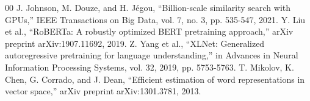 \documentclass[conference]{IEEEtran}
\begin{document}
\begin{thebibliography}{00}
 J. Johnson, M. Douze, and H. Jégou, ``Billion-scale similarity search with GPUs,'' IEEE Transactions on Big Data, vol. 7, no. 3, pp. 535-547, 2021.
 Y. Liu et al., ``RoBERTa: A robustly optimized BERT pretraining approach,'' arXiv preprint arXiv:1907.11692, 2019.
 Z. Yang et al., ``XLNet: Generalized autoregressive pretraining for language understanding,'' in Advances in Neural Information Processing Systems, vol. 32, 2019, pp. 5753-5763.
 T. Mikolov, K. Chen, G. Corrado, and J. Dean, ``Efficient estimation of word representations in vector space,'' arXiv preprint arXiv:1301.3781, 2013.
\end{thebibliography}
\end{document}
